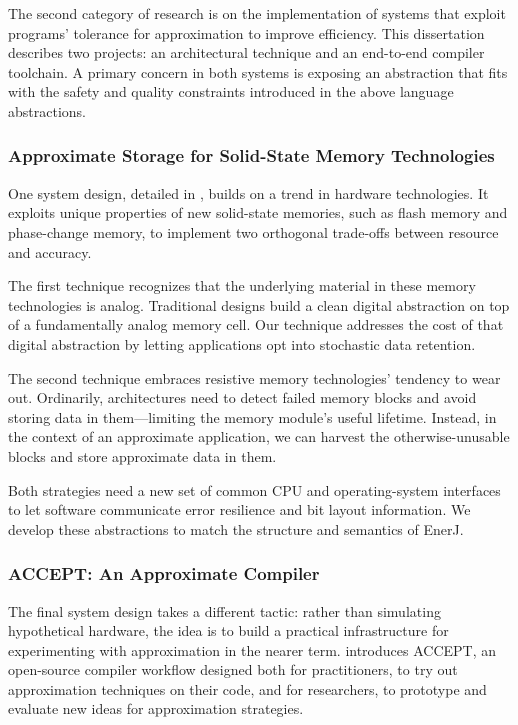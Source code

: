 The second category of research is on the implementation of systems that
exploit programs' tolerance for approximation to improve efficiency.
This dissertation describes two projects: an architectural technique and an
end-to-end compiler toolchain.
A primary concern in both systems is exposing an abstraction that fits with
the safety and quality constraints introduced in the above language
abstractions.

\subsubsection{Approximate Storage for Solid-State Memory Technologies}

One system design, detailed in , builds on a trend in hardware technologies.
It exploits unique properties of new solid-state memories,
such as flash memory and phase-change memory,
to implement two orthogonal trade-offs between resource and accuracy.

The first technique recognizes that the underlying material in these memory
technologies is analog.
Traditional designs build a clean digital abstraction on top of a
fundamentally analog memory cell.
Our technique addresses the cost of that digital abstraction by letting
applications opt into stochastic data retention.

The second technique embraces resistive memory technologies' tendency to wear
out.
Ordinarily, architectures need to detect failed memory blocks and avoid
storing data in them---limiting the memory module's useful lifetime.
Instead, in the context of an approximate application, we can harvest the otherwise-unusable
blocks and store approximate data in them.

Both strategies need a new set of common CPU and operating-system interfaces
to let software communicate error resilience and bit layout information.
We develop these abstractions to match the structure and semantics of EnerJ.

\subsubsection{ACCEPT: An Approximate Compiler}

The final system design takes a different tactic:
rather than simulating hypothetical hardware,
the idea is to build a practical infrastructure for experimenting with
approximation in the nearer term.
 introduces ACCEPT, an open-source compiler workflow designed both for
practitioners, to try out approximation techniques on their code,
and for researchers, to prototype and evaluate new ideas for approximation
strategies.

